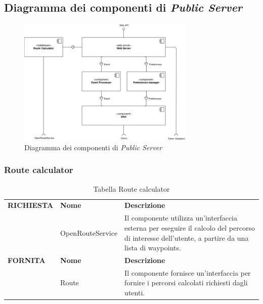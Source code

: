\documentclass{article}
\begin{document}
\clearpage

\subsection{Diagramma dei componenti di \textit{Public Server}}

\begin{figure}[htbp]
    \centering
    \includegraphics[width=0.75\textwidth]{Images/ComponentDiagram_Public.png}
    \caption{Diagramma dei componenti di \textit{Public Server}}
    \label{fig:component-diagram-public}
\end{figure}

\subsubsection{Route calculator}

\begin{table}[htbp]
    \centering
    \renewcommand{\arraystretch}{1.3} %
    \begin{tabularx}{\textwidth}{| l | l | X |}
        \Xhline{2pt}
        \textbf{RICHIESTA} & \textbf{Nome} & \textbf{Descrizione} \\
        \Xhline{2pt}
         & OpenRouteService & Il componente utilizza un'interfaccia esterna per eseguire il calcolo del percorso di interesse dell'utente, a partire da una lista di waypoints. \\
        \Xhline{2pt}
        \textbf{FORNITA} & \textbf{Nome} & \textbf{Descrizione} \\
        \Xhline{2pt}
         & Route & Il componente fornisce un'interfaccia per fornire i percorsi calcolati richiesti dagli utenti. \\
        \hline
    \end{tabularx}
    \caption{Tabella Route calculator}
\end{table}
\end{document}
